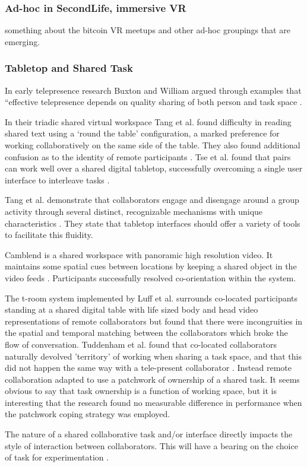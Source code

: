 \subsubsection{Ad-hoc in SecondLife, immersive VR}
something about the bitcoin VR meetups and other ad-hoc groupings that are emerging.
  \subsubsection{Tabletop and Shared Task}
In early telepresence research Buxton and William argued through examples that ``effective telepresence depends on quality sharing of both person and task space \cite{Buxton1992a}.\par
In their triadic shared virtual workspace Tang et al. found difficulty in reading shared text using a `round the table' configuration, a marked preference for working collaboratively on the same side of the table. They also found additional confusion as to the identity of remote participants \cite{Tang2010}.
Tse et al. found that pairs can work well over a shared digital tabletop, successfully overcoming a single user interface to interleave tasks \cite{Tse2007}.\par
Tang et al. demonstrate that collaborators engage and disengage around a group activity through several distinct, recognizable mechanisms with unique characteristics \cite{Tang2006}. They state that tabletop interfaces should offer a variety of tools to facilitate this fluidity.\par
Camblend is a shared workspace with panoramic high resolution video. It maintains some spatial cues between locations by keeping a shared object in the video feeds \cite{Norris2013a, Norris2012}. Participants successfully resolved co-orientation within the system.\par
The t-room system implemented by Luff et al. surrounds co-located participants standing at a shared digital table with life sized body and head video representations of remote collaborators \cite{Luff2011} but found that there were incongruities in the spatial and temporal matching between the collaborators which broke the flow of conversation.
Tuddenham et al. found that co-located collaborators naturally devolved 'territory' of working when sharing a task space, and that this did not happen the same way with a tele-present collaborator \cite{tuddenham2009territorial}. Instead remote collaboration adapted to use a patchwork of ownership of a shared task. It seems obvious to say that task ownership is a function of working space, but it is interesting that the research found no measurable difference in performance when the patchwork coping strategy was employed.\par
The nature of a shared collaborative task and/or interface directly impacts the style of interaction between collaborators. This will have a bearing on the choice of task for experimentation \cite{Jamil2011, Jetter2011a}.


